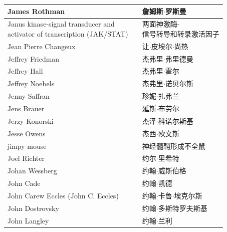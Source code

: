 \begin{longtable}{lll}
	\midrule
	James Rothman   && 詹姆斯$\cdot$罗斯曼  \\
	
	\midrule
	\makecell[l]{Janus kinase-signal transducer and \\activator of transcription (JAK/STAT)}  && \makecell[l]{两面神激酶-\\信号转导和转录激活因子}  \\
	
	\midrule
	Jean Pierre Changeux   && 让$\cdot$皮埃尔$\cdot$尚热  \\
	
	\midrule
	Jeffrey Friedman   && 杰弗里$\cdot$弗里德曼  \\
	
	\midrule
	Jeffrey Hall   && 杰弗里$\cdot$霍尔  \\
	
	\midrule
	Jeffrey Noebels   && 杰弗里$\cdot$诺贝尔斯  \\
	
	\midrule
	Jenny Saffran   && 珍妮$\cdot$扎弗兰  \\
	
	\midrule
	Jens Brauer   && 延斯$\cdot$布劳尔  \\
	
	\midrule
	Jerzy Konorski   && 杰泽$\cdot$科诺尔斯基  \\
	
	\midrule
	Jesse Owens   && 杰西$\cdot$欧文斯  \\
	
	\midrule
	jimpy mouse   && 神经髓鞘形成不全鼠  \\
	
	\midrule
	Joel Richter   && 约尔$\cdot$里希特  \\
	
	\midrule
	Johan Wessberg   && 约翰$\cdot$威斯伯格  \\
	
	\midrule
	John Cade   && 约翰$\cdot$凯德  \\
	
	\midrule
	John Carew Eccles (John C. Eccles)   && 约翰$\cdot$卡鲁$\cdot$埃克尔斯  \\
	
	\midrule
	John Dostrovsky   && 约翰$\cdot$多斯特罗夫斯基  \\
	
	\midrule
	John Langley   && 约翰$\cdot$兰利  \\
	

\end{longtable}
